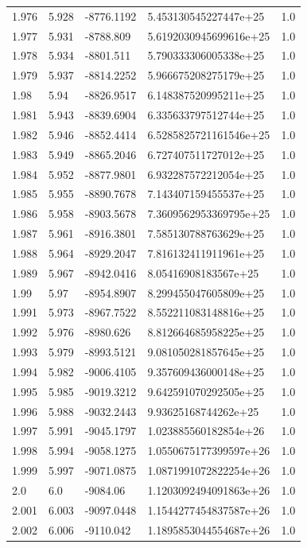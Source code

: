\begin{tabular}{lllll}
1.976 & 5.928 & -8776.1192 & 5.453130545227447e+25 & 1.0 \\
1.977 & 5.931 & -8788.809 & 5.6192030945699616e+25 & 1.0 \\
1.978 & 5.934 & -8801.511 & 5.790333306005338e+25 & 1.0 \\
1.979 & 5.937 & -8814.2252 & 5.966675208275179e+25 & 1.0 \\
1.98 & 5.94 & -8826.9517 & 6.148387520995211e+25 & 1.0 \\
1.981 & 5.943 & -8839.6904 & 6.335633797512744e+25 & 1.0 \\
1.982 & 5.946 & -8852.4414 & 6.5285825721161546e+25 & 1.0 \\
1.983 & 5.949 & -8865.2046 & 6.727407511727012e+25 & 1.0 \\
1.984 & 5.952 & -8877.9801 & 6.932287572212054e+25 & 1.0 \\
1.985 & 5.955 & -8890.7678 & 7.143407159455537e+25 & 1.0 \\
1.986 & 5.958 & -8903.5678 & 7.3609562953369795e+25 & 1.0 \\
1.987 & 5.961 & -8916.3801 & 7.585130788763629e+25 & 1.0 \\
1.988 & 5.964 & -8929.2047 & 7.816132411911961e+25 & 1.0 \\
1.989 & 5.967 & -8942.0416 & 8.05416908183567e+25 & 1.0 \\
1.99 & 5.97 & -8954.8907 & 8.299455047605809e+25 & 1.0 \\
1.991 & 5.973 & -8967.7522 & 8.552211083148816e+25 & 1.0 \\
1.992 & 5.976 & -8980.626 & 8.812664685958225e+25 & 1.0 \\
1.993 & 5.979 & -8993.5121 & 9.081050281857645e+25 & 1.0 \\
1.994 & 5.982 & -9006.4105 & 9.357609436000148e+25 & 1.0 \\
1.995 & 5.985 & -9019.3212 & 9.642591070292505e+25 & 1.0 \\
1.996 & 5.988 & -9032.2443 & 9.93625168744262e+25 & 1.0 \\
1.997 & 5.991 & -9045.1797 & 1.023885560182854e+26 & 1.0 \\
1.998 & 5.994 & -9058.1275 & 1.0550675177399597e+26 & 1.0 \\
1.999 & 5.997 & -9071.0875 & 1.0871991072822254e+26 & 1.0 \\
2.0 & 6.0 & -9084.06 & 1.1203092494091863e+26 & 1.0 \\
2.001 & 6.003 & -9097.0448 & 1.1544277454837587e+26 & 1.0 \\
2.002 & 6.006 & -9110.042 & 1.1895853044554687e+26 & 1.0 \\

\end{tabular}

